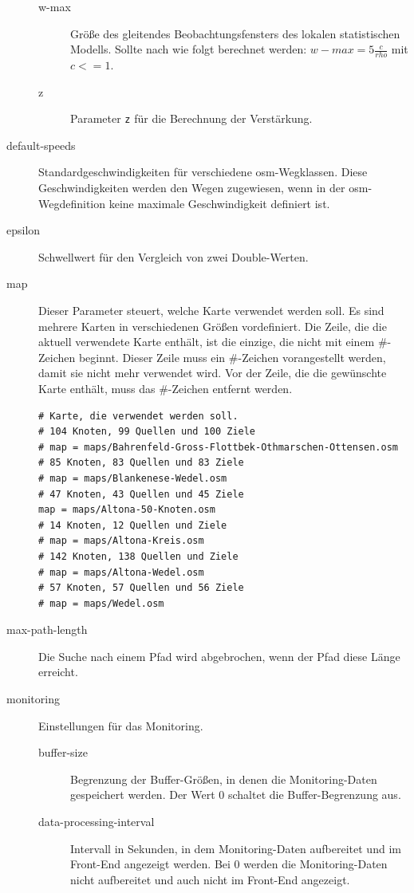 \begin{description}
\begin{description}
      \item[w-max] Größe des gleitendes Beobachtungsfensters des lokalen statistischen Modells.
        Sollte nach \cite{DorigoStuetzle2004} wie folgt berechnet werden: $w-max = 5 \frac{c}{rho}$ mit $c <= 1$.
      \item[z] Parameter \texttt{z} für die Berechnung der Verstärkung.
    \end{description}
  \item[default-speeds] Standardgeschwindigkeiten für verschiedene \ac{osm}-Wegklassen.
    Diese Geschwindigkeiten werden den Wegen zugewiesen, wenn in der \ac{osm}-Wegdefinition keine maximale Geschwindigkeit definiert ist.
  \item[epsilon] Schwellwert für den Vergleich von zwei Double-Werten.
  \item[map] Dieser Parameter steuert, welche Karte verwendet werden soll.
    Es sind mehrere Karten in verschiedenen Größen vordefiniert.
    Die Zeile, die die aktuell verwendete Karte enthält, ist die einzige, die nicht mit einem \#-Zeichen beginnt.
    Dieser Zeile muss ein \#-Zeichen vorangestellt werden, damit sie nicht mehr verwendet wird.
    Vor der Zeile, die die gewünschte Karte enthält, muss das \#-Zeichen entfernt werden.
    \begin{lstlisting}[caption = Karten, label = lst:karten]
# Karte, die verwendet werden soll.
# 104 Knoten, 99 Quellen und 100 Ziele
# map = maps/Bahrenfeld-Gross-Flottbek-Othmarschen-Ottensen.osm
# 85 Knoten, 83 Quellen und 83 Ziele
# map = maps/Blankenese-Wedel.osm
# 47 Knoten, 43 Quellen und 45 Ziele
map = maps/Altona-50-Knoten.osm
# 14 Knoten, 12 Quellen und Ziele
# map = maps/Altona-Kreis.osm
# 142 Knoten, 138 Quellen und Ziele
# map = maps/Altona-Wedel.osm
# 57 Knoten, 57 Quellen und 56 Ziele
# map = maps/Wedel.osm
    \end{lstlisting}
  \item[max-path-length] Die Suche nach einem Pfad wird abgebrochen, wenn der Pfad diese Länge erreicht.
  \item[monitoring] Einstellungen für das Monitoring.
    \begin{description}
      \item[buffer-size] Begrenzung der Buffer-Größen, in denen die Monitoring-Daten gespeichert werden.
        Der Wert 0 schaltet die Buffer-Begrenzung aus.
      \item[data-processing-interval] Intervall in Sekunden, in dem Monitoring-Daten aufbereitet und im Front-End angezeigt werden.
        Bei 0 werden die Monitoring-Daten nicht aufbereitet und auch nicht im Front-End angezeigt.

\end{description}
\end{description}
